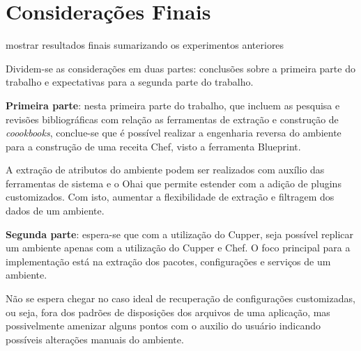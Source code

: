 \newpage\null\thispagestyle{empty}\newpage
\chapter{Considerações Finais}
\label{chap:result-parc}

{\color{red} mostrar resultados finais sumarizando os experimentos anteriores}

Dividem-se as considerações em duas partes: conclusões
sobre a primeira parte do trabalho e expectativas para
a segunda parte do trabalho.

\textbf{Primeira parte}: nesta primeira parte do trabalho, que
incluem as pesquisa e revisões bibliográficas com relação
as ferramentas de extração e construção de \textit{coookbooks},
conclue-se que é possível realizar a engenharia reversa do
ambiente para a construção de uma receita Chef, visto a
ferramenta Blueprint.

A extração de atributos do ambiente podem ser realizados
com auxílio das ferramentas de sistema e o Ohai que permite
estender com a adição de plugins customizados. Com isto,
aumentar a flexibilidade de extração e filtragem dos dados
de um ambiente.

\textbf{Segunda parte}: espera-se que com a utilização do Cupper,
seja possível replicar um ambiente apenas com a utilização
do Cupper e Chef. O foco principal para a implementação
está na extração dos pacotes, configurações e serviços
de um ambiente.

Não se espera chegar no caso ideal de
recuperação de configurações customizadas, ou seja, fora
dos padrões de disposições dos arquivos de uma aplicação,
mas possivelmente amenizar alguns pontos com o auxilio do
usuário indicando possíveis alterações manuais do ambiente.
